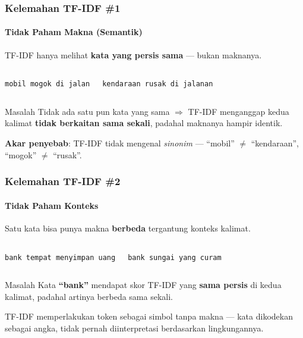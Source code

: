 \documentclass[t,aspectratio=169,xcolor=dvipsnames]{beamer}
\begin{document}
\begin{frame}
    \frametitle{Kelemahan TF-IDF \#1}
    \framesubtitle{Tidak Paham Makna (Semantik)}
    \small
    TF-IDF hanya melihat \textbf{kata yang persis sama} --- bukan maknanya.
    \vspace{0.5em}

    \begin{columns}[T]
        \begin{tcolorbox}[colback=gray!10, colframe=gray!50, title=Kalimat A, fonttitle=\small\bfseries]
            \texttt{mobil mogok di jalan}
        \end{tcolorbox}
        \begin{tcolorbox}[colback=gray!10, colframe=gray!50, title=Kalimat B, fonttitle=\small\bfseries]
            \texttt{kendaraan rusak di jalanan}
        \end{tcolorbox}
    \end{columns}
    \vspace{0.5em}
    \begin{alertblock}{Masalah}
        Tidak ada satu pun kata yang sama $\Rightarrow$ TF-IDF menganggap kedua kalimat \textbf{tidak berkaitan sama sekali}, padahal maknanya hampir identik.
    \end{alertblock}
    \vspace{0.3em}
    \textbf{Akar penyebab}: TF-IDF tidak mengenal \textit{sinonim} --- ``mobil'' $\neq$ ``kendaraan'', ``mogok'' $\neq$ ``rusak''.
\end{frame}

\begin{frame}
    \frametitle{Kelemahan TF-IDF \#2}
    \framesubtitle{Tidak Paham Konteks}
    \small
    Satu kata bisa punya makna \textbf{berbeda} tergantung konteks kalimat.
    \vspace{0.5em}

    \begin{columns}[T]
        \begin{tcolorbox}[colback=nyublue!8, colframe=nyublue!50, title=Konteks Keuangan, fonttitle=\small\bfseries]
            \texttt{bank tempat menyimpan uang}
        \end{tcolorbox}
        \begin{tcolorbox}[colback=nyublue!8, colframe=nyublue!50, title=Konteks Alam, fonttitle=\small\bfseries]
            \texttt{bank sungai yang curam}
        \end{tcolorbox}
    \end{columns}
    \vspace{0.5em}
    \begin{alertblock}{Masalah}
        Kata \textbf{``bank''} mendapat skor TF-IDF yang \textbf{sama persis} di kedua kalimat, padahal artinya berbeda sama sekali.
    \end{alertblock}
    \vspace{0.3em}
    TF-IDF memperlakukan token sebagai simbol tanpa makna --- kata dikodekan sebagai angka, tidak pernah diinterpretasi berdasarkan lingkungannya.
\end{frame}
\end{document}

